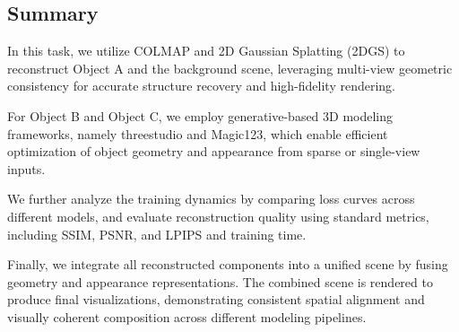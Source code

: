 \subsection{Summary}
In this task, we utilize COLMAP and 2D Gaussian Splatting (2DGS) to reconstruct Object A and the background scene, leveraging multi-view geometric consistency for accurate structure recovery and high-fidelity rendering. 

For Object B and Object C, we employ generative-based 3D modeling frameworks, namely threestudio and Magic123, which enable efficient optimization of object geometry and appearance from sparse or single-view inputs.

We further analyze the training dynamics by comparing loss curves across different models, and evaluate reconstruction quality using standard metrics, including SSIM, PSNR, and LPIPS and training time.

Finally, we integrate all reconstructed components into a unified scene by fusing geometry and appearance representations. The combined scene is rendered to produce final visualizations, demonstrating consistent spatial alignment and visually coherent composition across different modeling pipelines.